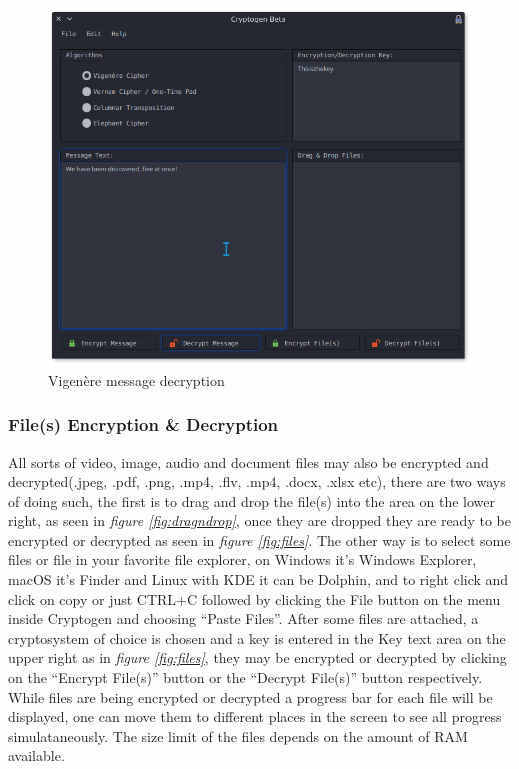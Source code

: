 \documentclass[11pt]{article}
\begin{document}
\begin{figure}[!htb]
\centering
\includegraphics[scale=0.55]{vigenere_message_plain}
\caption{Vigen\`ere message decryption} %
\label{fig:vigenere_message_plain} %
\end{figure}


\newpage
	\subsubsection{File(s) Encryption \& Decryption}
	All sorts of video, image, audio and document files may also be encrypted and decrypted(.jpeg, .pdf, .png, .mp4, .flv, .mp4, .docx, .xlsx  etc), there are two ways of doing such, the first is to drag and drop the file(s) into the area on the lower right, as seen in \textit{figure \ref{fig:dragndrop}}, once they are dropped they are ready to be encrypted or decrypted as seen in \textit{figure \ref{fig:files}}. The other way is to select some files or file in your favorite file explorer, on Windows it's Windows Explorer, macOS it's Finder and Linux with KDE it can be Dolphin, and to right click and click on copy or just CTRL+C followed by clicking the File button on the menu inside Cryptogen and choosing ``Paste Files''. After some files are attached, a cryptosystem of choice is chosen and a key is entered in the Key text area on the upper right as in \textit{figure \ref{fig:files}}, they may be encrypted or decrypted by clicking on the ``Encrypt File(s)'' button or the ``Decrypt File(s)'' button respectively. While files are being encrypted or decrypted a progress bar for each file will be displayed, one can move them to different places in the screen to see all progress simulataneously. The size limit of the files depends on the amount of RAM available.\\
\end{document}
